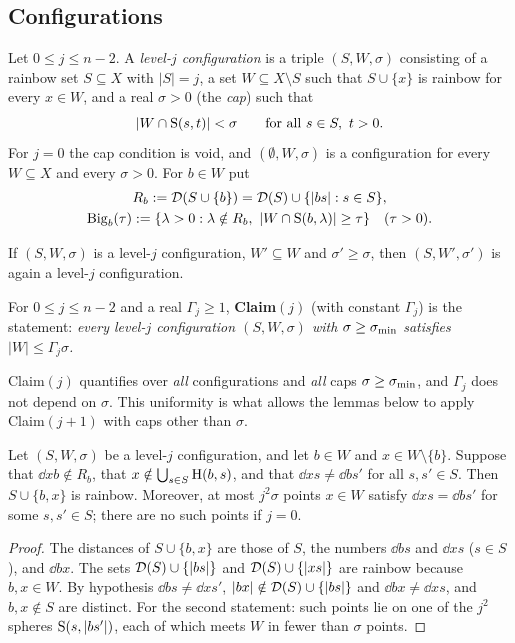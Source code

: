 \subsection{Configurations}

\begin{definition}\label{def:config}
Let $0\le j\le n-2$. A \emph{level-$j$ configuration} is a triple $(S,W,\sigma)$ consisting of a rainbow set
$S\subseteq X$ with $|S|=j$, a set $W\subseteq X\setminus S$ such that $S\cup\{x\}$ is rainbow for every $x\in W$, and a
real $\sigma>0$ (the \emph{cap}) such that
\[
|W\cap\mathrm{S}(s,t)|<\sigma\qquad\text{for all }s\in S,\ t>0 .
\]
For $j=0$ the cap condition is void, and $(\emptyset,W,\sigma)$ is a configuration for every $W\subseteq X$
and every $\sigma>0$. For $b\in W$ put
\begin{gather*}
R_b:=\Dist(S\cup\{b\})=\Dist(S)\cup\{\dd bs:s\in S\},\\
\Bg_b(\tau):=\{\lambda>0:\lambda\notin R_b,\ |W\cap\Sph(b,\lambda)|\ge\tau\}\quad(\tau>0).
\end{gather*}
\end{definition}

If $(S,W,\sigma)$ is a level-$j$ configuration, $W'\subseteq W$ and $\sigma'\ge\sigma$, then $(S,W',\sigma')$ is
again a level-$j$ configuration.

\begin{definition}[Claim$(j)$]\label{def:claim}
For $0\le j\le n-2$ and a real $\Gamma_j\ge1$, \textbf{Claim$(j)$} (with constant $\Gamma_j$) is the statement:
\emph{every level-$j$ configuration $(S,W,\sigma)$ with $\sigma\ge\sigma_{\min}$ satisfies $|W|\le\Gamma_j\sigma$.}
\end{definition}

Claim$(j)$ quantifies over \emph{all} configurations and \emph{all} caps $\sigma\ge\sigma_{\min}$, and $\Gamma_j$ does
not depend on $\sigma$. This uniformity is what allows the lemmas below to apply Claim$(j+1)$ with caps
other than $\sigma$.

\begin{lemma}[extension]\label{lem:ext}
Let $(S,W,\sigma)$ be a level-$j$ configuration, and let $b\in W$ and $x\in W\setminus\{b\}$. Suppose that
$\dd xb\notin R_b$, that $x\notin\bigcup_{s\in S}\mathrm{H}(b,s)$, and that $\dd xs\ne\dd b{s'}$ for all $s,s'\in S$.
Then $S\cup\{b,x\}$ is rainbow. Moreover, at most $j^2\sigma$ points $x\in W$ satisfy $\dd xs=\dd b{s'}$ for some
$s,s'\in S$; there are no such points if $j=0$.
\end{lemma}
\begin{proof}
The distances of $S\cup\{b,x\}$ are those of $S$, the numbers $\dd bs$ and $\dd xs$ ($s\in S$), and $\dd bx$. The
sets $\mathcal{D}(S)\cup\{|bs|\}$ and $\mathcal{D}(S)\cup\{|xs|\}$ are rainbow because $b,x\in W$. By hypothesis
$\dd bs\ne\dd x{s'}$, $|bx|\notin\mathcal{D}(S)\cup\{|bs|\}$ and $\dd bx\ne\dd xs$, and $b,x\notin S$ are distinct.
For the second statement: such points lie on one of the $j^2$ spheres $\mathrm{S}(s,|bs'|)$, each of which meets
$W$ in fewer than $\sigma$ points.
\end{proof}

